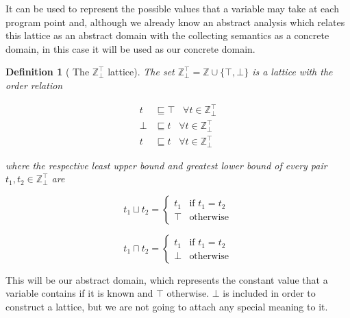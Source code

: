 \documentclass{article}
\newtheorem{definition}{Definition}
\begin{document}
It can be used to represent the possible values that a variable 
may take at each program point and, although we already know an 
abstract analysis which relates this lattice as an abstract domain 
with the collecting semantics as a concrete domain, in this case
it will be used as our concrete domain.

\begin{definition}[
  The $\mathbb{Z}_\bot^\top$ lattice
]\label{def:clattice}
  The set $\mathbb{Z}_\bot^\top = \mathbb{Z} \cup \{\top, \bot\}$
  is a lattice with the order relation
  
  \begin{align*}
    t &\sqsubseteq \top \;\;\; 
      \forall t \in \mathbb{Z}_\bot^\top \\ 
    \bot &\sqsubseteq t \;\;\; 
      \forall t \in \mathbb{Z}_\bot^\top \\ 
    t &\sqsubseteq t \;\;\; 
      \forall t \in \mathbb{Z}_\bot^\top 
  \end{align*}

  where the respective least upper bound and greatest lower bound
  of every pair $t_1, t_2 \in \mathbb{Z}_\bot^\top$ are

  $$
    t_1 \sqcup t_2 = 
    \begin{cases}
      t_1 & \text{if } t_1 = t_2 \\
      \top & \text{otherwise}
    \end{cases}
  $$

  $$
  t_1 \sqcap t_2 = 
  \begin{cases}
    t_1 & \text{if } t_1 = t_2 \\
    \bot & \text{otherwise}
  \end{cases}
  $$
\end{definition}

This will be our abstract domain, which represents the constant 
value that a variable contains if it is known and $\top$ otherwise.
$\bot$ is included in order to construct a lattice, but we are 
not going to attach any special meaning to it.
\end{document}
